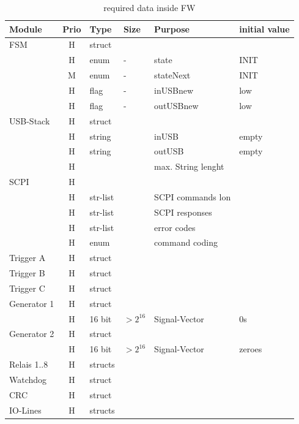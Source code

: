 	\begin{table}[ht!]
	\centering
	\begin{tabular}{|l|c|l|l|l|l|}
	\hline
	\redrow Module	& Prio & Type	& Size 	& Purpose		& initial value \\ \hline
	FSM			& H	& struct	& 			& 					& 		\\ \hline
				& H	& enum		& -			& state				& INIT	\\ \hline
				& M	& enum		& -			& stateNext			& INIT	\\ \hline
				& H	& flag		& -			& inUSBnew			& low	\\ \hline
				& H	& flag		& -			& outUSBnew			& low	\\ \hline
	USB-Stack	& H	& struct	& 			& 					& 		\\ \hline
				& H	& string	& 			& inUSB				& empty	\\ \hline
				& H	& string	& 			& outUSB			& empty	\\ \hline
				& H	& 			& 			& max. String lenght		& 		\\ \hline
	SCPI		& H	& 			& 			& 					& 		\\ \hline
				& H	& str-list	& 			& SCPI commands	lon & 		\\ \hline
				& H	& str-list	& 			& SCPI responses	& 		\\ \hline
				& H	& str-list	& 			& error codes		& 		\\ \hline
				& H	& enum		& 			& command coding	& 		\\ \hline
	Trigger A	& H	& struct	& 			& 					& 		\\ \hline
	Trigger B	& H	& struct	& 			& 					& 		\\ \hline
	Trigger C	& H	& struct	& 			& 					& 		\\ \hline
	Generator 1	& H	& struct	& 			& 					& 		\\ \hline
				& H	& 16 bit	& $>2^{16}$	& Signal-Vector		& 0s	\\ \hline
	Generator 2	& H	& struct	& 			&					& 		\\ \hline
				& H	& 16 bit	& $>2^{16}$	& Signal-Vector		& zeroes\\ \hline
	Relais 1..8	& H	& structs	& 			& 					& 		\\ \hline
	Watchdog	& H	& struct	& 			& 					& 		\\ \hline
	CRC			& H	& struct	& 			& 					& 		\\ \hline
	IO-Lines	& H	& structs	& 			& 					& 		\\ \hline
			\end{tabular}
		\caption{ required data inside FW }
	\label{tab:Vars}
	\end{table}
	
